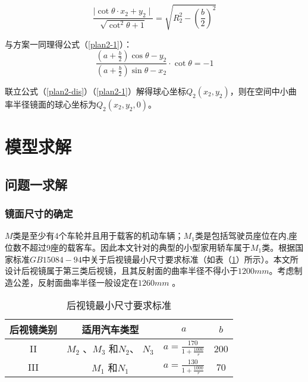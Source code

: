 \documentclass[bwprint]{cumcmthesis}
\begin{document}
\begin{equation}
\label{plan2-dis}
	\frac{\mid \mathop{cot}\theta \cdot x_2 + y_2 \mid}{\sqrt{\mathop{cot}^{2} \theta + 1}} = \sqrt{R_2^2 - \left( \frac{b}{2} \right)^2} 	
\end{equation}
\par 与方案一同理得公式（\ref{plan2-1}）：
\begin{equation}
\label{plan2-1}
	\frac{\left(a + \frac{b}{2}\right) \mathop{cos} \theta - y_2}{\left( a+ \frac{b}{2} \right) \mathop{sin} \theta - x_2} \cdot \mathop{cot}\theta = -1
\end{equation}
\par 联立公式（\ref{plan2-dis}）（\ref{plan2-1}）解得球心坐标$Q_2(x_2,y_2)$，则在空间中小曲率半径镜面的球心坐标为$Q_2(x_2,y_2,0)$。

\section{模型求解}

\subsection{问题一求解}

\subsubsection{镜面尺寸的确定}
\par $M$类是至少有4个车轮并且用于载客的机动车辆；$M_1$类是包括驾驶员座位在内,座位数不超过9座的载客车。因此本文针对的典型的小型家用轿车属于$M_1$类。根据国家标准$GB 15084-94$中关于后视镜最小尺寸要求标准（如表（\ref{后视镜最小尺寸要求标准}）所示）。本文所设计后视镜属于第三类后视镜，且其反射面的曲率半径不得小于$1200mm$。考虑制造公差，反射面曲率半径一般设定在$1260mm$ 。

\begin{table}[!htbp]
\centering
\caption{后视镜最小尺寸要求标准}
\label{后视镜最小尺寸要求标准}
\begin{tabular}{cccc}
\toprule
后视镜类别 & 适用汽车类型 & $a$ & $b$	\\ \midrule
 II	 & $M_2$ 、$M_3$ 和$N_2$、 $N_3$ &  $a =  \frac{170}{1+\frac{1000}{r}}$& 200\\ 
III & $M_1$ 和$N_1$& $a =  \frac{130}{1+\frac{1000}{r}}$&  70\\ 
\bottomrule 
\end{tabular}
\end{table}
\end{document}
